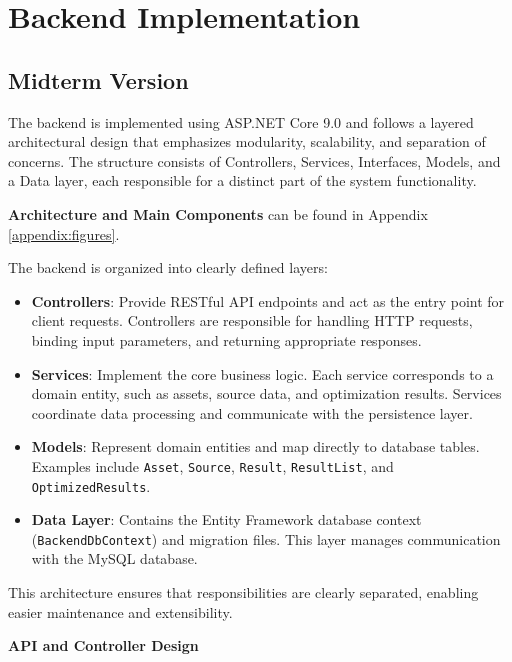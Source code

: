 \section{Backend Implementation}
\subsection{Midterm Version}

\hspace*{1cm}The backend is implemented using ASP.NET Core 9.0 and follows a layered architectural design that emphasizes modularity, scalability, and separation of concerns. The structure consists of Controllers, Services, Interfaces, Models, and a Data layer, each responsible for a distinct part of the system functionality.


\textbf{Architecture and Main Components} can be found in Appendix \ref{appendix:figures}.


The backend is organized into clearly defined layers:

\begin{itemize}
    \item \textbf{Controllers}: Provide RESTful API endpoints and act as the entry point for client requests. Controllers are responsible for handling HTTP requests, binding input parameters, and returning appropriate responses.
    
    \item \textbf{Services}: Implement the core business logic. Each service corresponds to a domain entity, such as assets, source data, and optimization results. Services coordinate data processing and communicate with the persistence layer.
    
    \item \textbf{Models}: Represent domain entities and map directly to database tables. Examples include \texttt{Asset}, \texttt{Source}, \texttt{Result}, \texttt{ResultList}, and \texttt{OptimizedResults}.
    
    \item \textbf{Data Layer}: Contains the Entity Framework database context (\texttt{BackendDbContext}) and migration files. This layer manages communication with the MySQL database.
\end{itemize}

\hspace*{1cm}This architecture ensures that responsibilities are clearly separated, enabling easier maintenance and extensibility.


\textbf{API and Controller Design}

